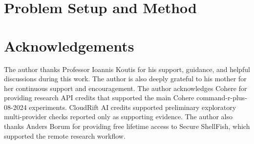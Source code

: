 \documentclass[smallcondensed]{svjour3}
\begin{document}


\section{Problem Setup and Method}
\label{sec:problem_setup_method}












    
    
    
    
    

    
    
    
    





\section*{Acknowledgements}
The author thanks Professor Ioannis Koutis for his support, guidance, and helpful
discussions during this work. The author is also deeply grateful to his mother for
her continuous support and encouragement. The author acknowledges Cohere for providing research API credits that
supported the main Cohere command-r-plus-08-2024 experiments. CloudRift AI
credits supported preliminary exploratory multi-provider checks reported only
as supporting evidence. The author also thanks Anders Borum for providing free
lifetime access to Secure ShellFish, which supported the remote research
workflow.






\clearpage

\end{document}
